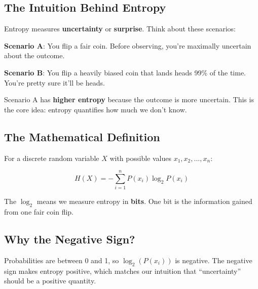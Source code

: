 \documentclass[
  11pt,
  letterpaper,
  oneside,
  openany]{book}
\begin{document}
\subsection{The Intuition Behind
Entropy}\label{the-intuition-behind-entropy}

Entropy measures \textbf{uncertainty} or \textbf{surprise}. Think about
these scenarios:

\textbf{Scenario A}: You flip a fair coin. Before observing, you're
maximally uncertain about the outcome.

\textbf{Scenario B}: You flip a heavily biased coin that lands heads
99\% of the time. You're pretty sure it'll be heads.

Scenario A has \textbf{higher entropy} because the outcome is more
uncertain. This is the core idea: entropy quantifies how much we don't
know.

\subsection{The Mathematical
Definition}\label{the-mathematical-definition}

For a discrete random variable \(X\) with possible values
\(x_1, x_2, ..., x_n\):

\[H(X) = -\sum_{i=1}^{n} P(x_i) \log_2 P(x_i)\]

The \(\log_2\) means we measure entropy in \textbf{bits}. One bit is the
information gained from one fair coin flip.

\subsection{Why the Negative Sign?}\label{why-the-negative-sign}

Probabilities are between 0 and 1, so \(\log_2(P(x_i))\) is negative.
The negative sign makes entropy positive, which matches our intuition
that ``uncertainty'' should be a positive quantity.
\end{document}
